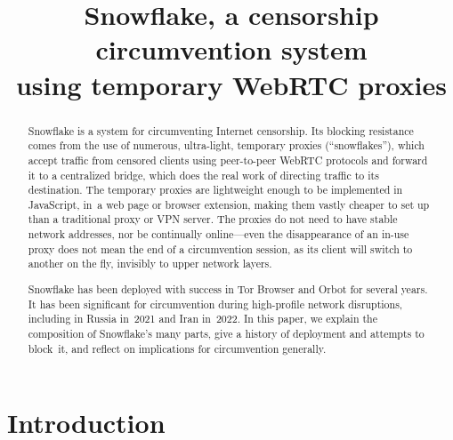 \documentclass[letterpaper,twocolumn]{article}
\begin{document}
\date{}

\title{\Large\bf Snowflake, a censorship circumvention system\\using temporary WebRTC proxies}

\author{}

\maketitle

\begin{abstract}
Snowflake is a system for circumventing Internet censorship.
Its blocking resistance comes from
the use of numerous, ultra-light, temporary proxies (``snowflakes''),
which accept traffic from censored clients using peer-to-peer WebRTC protocols
and forward it to a centralized bridge,
which does the real work of directing traffic to its destination.
The temporary proxies are lightweight enough to be implemented in JavaScript,
in~a web page or browser extension,
making them vastly cheaper to set up than
a traditional proxy or VPN server.
The proxies do not need to have stable network addresses,
nor be continually online---even
the disappearance of an \mbox{in-use} proxy
does not mean the end of a circumvention session,
as its client will switch to another on the fly,
invisibly to upper network layers.


Snowflake has been deployed with success
in Tor Browser and Orbot for several years.
It has been significant for circumvention
during high-profile network disruptions,
including in Russia in~2021 and Iran in~2022.
In this paper, we explain the composition of Snowflake's many parts,
give a history of deployment and attempts to block~it,
and reflect on implications for circumvention generally.
\end{abstract}


\section{Introduction}
\label{sec:intro}
\end{document}
